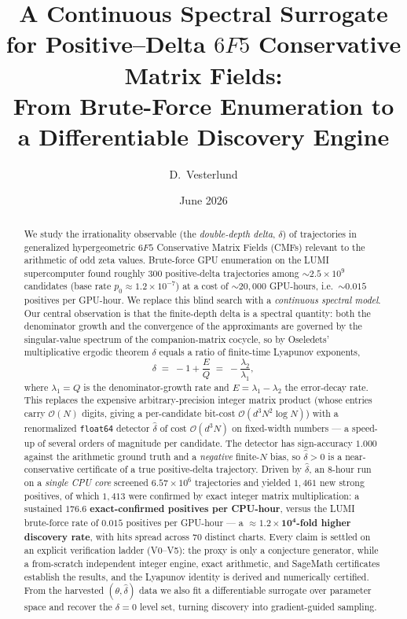 \documentclass[11pt,a4paper]{article}
\title{\bfseries A Continuous Spectral Surrogate for Positive--Delta
$6F5$ Conservative Matrix Fields:\\[2pt]
\large From Brute-Force Enumeration to a Differentiable Discovery Engine}
\author{D.\ Vesterlund}
\date{June 2026}
\theoremstyle{definition}
\newcommand{\dhat}{\hat{\delta}}
\newcommand{\bigO}{\mathcal{O}}
\begin{document}
\maketitle

\begin{abstract}
We study the irrationality observable (the \emph{double-depth delta}, $\delta$) of
trajectories in generalized hypergeometric $6F5$ Conservative Matrix Fields (CMFs)
relevant to the arithmetic of odd zeta values. Brute-force GPU enumeration on the LUMI
supercomputer found roughly $300$ positive-delta trajectories among ${\sim}2.5\times10^{9}$
candidates (base rate $p_0\approx1.2\times10^{-7}$) at a cost of ${\sim}20{,}000$ GPU-hours,
i.e.\ ${\sim}0.015$ positives per GPU-hour. We replace this blind search with a
\emph{continuous spectral model}. Our central observation is that the finite-depth delta is a
spectral quantity: both the denominator growth and the convergence of the approximants are
governed by the singular-value spectrum of the companion-matrix cocycle, so by Oseledets'
multiplicative ergodic theorem $\delta$ equals a ratio of finite-time Lyapunov exponents,
\[
  \delta \;=\; -1 + \frac{E}{Q} \;=\; -\frac{\lambda_2}{\lambda_1},
\]
where $\lambda_1=Q$ is the denominator-growth rate and $E=\lambda_1-\lambda_2$ the
error-decay rate. This replaces the expensive arbitrary-precision integer matrix product
(whose entries carry $\bigO(N)$ digits, giving a per-candidate bit-cost $\bigO(d^3N^2\log N)$)
with a renormalized \texttt{float64} detector $\dhat$ of cost $\bigO(d^3N)$ on fixed-width
numbers --- a speed-up of several orders of magnitude per candidate. The detector has
sign-accuracy $1.000$ against the arithmetic ground truth and a \emph{negative} finite-$N$
bias, so $\dhat>0$ is a near-conservative certificate of a true positive-delta trajectory.
Driven by $\dhat$, an $8$-hour run on a \emph{single CPU core} screened $6.57\times10^{6}$
trajectories and yielded $1{,}461$ new strong positives, of which $1{,}413$ were confirmed by
exact integer matrix multiplication: a sustained $\mathbf{176.6}$ \textbf{exact-confirmed
positives per CPU-hour}, versus the LUMI brute-force rate of $0.015$ positives per GPU-hour
--- a $\boldsymbol{\approx}\mathbf{1.2\times10^{4}}$\textbf{-fold higher discovery rate},
with hits spread across $70$ distinct charts. Every claim is settled on an explicit
verification ladder (V0--V5): the proxy is only a conjecture generator, while a from-scratch
independent integer engine, exact arithmetic, and SageMath certificates establish the
results, and the Lyapunov identity is derived and numerically certified. From the harvested
$(\theta,\dhat)$ data we also fit a differentiable surrogate over parameter space and recover
the $\delta=0$ level set, turning discovery into gradient-guided sampling.
\end{abstract}
\end{document}
